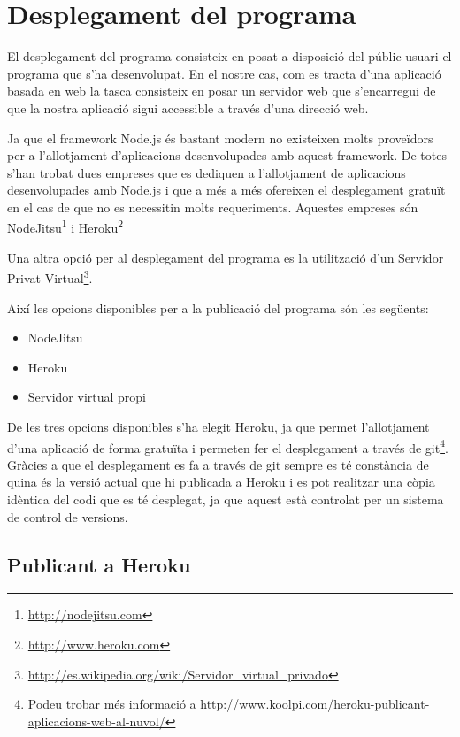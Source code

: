 \chapter{Desplegament del programa}
\label{chap:desplegament}

El desplegament del programa consisteix en posat a disposició del públic usuari el programa que s'ha desenvolupat. En el nostre cas, com es tracta d'una aplicació basada en web la tasca consisteix en posar un servidor web que s'encarregui de que la nostra aplicació sigui accessible a través d'una direcció web. 

Ja que el framework Node.js és bastant modern no existeixen molts proveïdors per a l'allotjament d'aplicacions desenvolupades amb aquest framework. De totes s'han trobat dues empreses que es dediquen a l'allotjament de aplicacions desenvolupades amb Node.js i que a més a més ofereixen el desplegament gratuït en el cas de que no es necessitin molts requeriments. Aquestes empreses són NodeJitsu\footnote{\url{http://nodejitsu.com}} i Heroku\footnote{\url{http://www.heroku.com}}

Una altra opció per al desplegament del programa es la utilització d'un Servidor Privat Virtual\footnote{\url{http://es.wikipedia.org/wiki/Servidor_virtual_privado}}. 

Així les opcions disponibles per a la publicació del programa són les següents: 

\begin{itemize}
\item{NodeJitsu}
\item{Heroku}
\item{Servidor virtual propi}
\end{itemize}


De les tres opcions disponibles s'ha elegit Heroku, ja que permet l'allotjament d'una aplicació de forma gratuïta i permeten fer el desplegament a través de git\footnote{Podeu trobar més informació a \url{http://www.koolpi.com/heroku-publicant-aplicacions-web-al-nuvol/} }. Gràcies a que el desplegament es fa a través de git sempre es té constància de quina és la versió actual que hi publicada a Heroku i es pot realitzar una còpia idèntica del codi que es té desplegat, ja que aquest està controlat per un sistema de control de versions.

\section{Publicant a Heroku}

